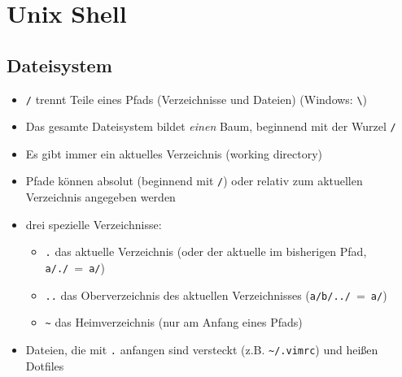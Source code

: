 \documentclass{article}
\begin{document}
  \section{Unix Shell}
    \subsection{Dateisystem}
      \begin{itemize}
        \item \texttt{/} trennt Teile eines Pfads (Verzeichnisse und Dateien) (Windows: \texttt{\textbackslash})
        \item Das gesamte Dateisystem bildet \emph{einen} Baum, beginnend mit der Wurzel \texttt{/}
        \item Es gibt immer ein aktuelles Verzeichnis (working directory)
        \item Pfade können absolut (beginnend mit \texttt{/}) oder relativ zum aktuellen Verzeichnis angegeben werden
        \item drei spezielle Verzeichnisse:
          \begin{itemize}
            \item \texttt{.} das aktuelle Verzeichnis (oder der aktuelle im bisherigen Pfad, \texttt{a/./}~=~\texttt{a/})
            \item \texttt{..} das Oberverzeichnis des aktuellen Verzeichnisses (\texttt{a/b/../}~=~\texttt{a/})
            \item \texttt{\textasciitilde} das Heimverzeichnis (nur am Anfang eines Pfads)
          \end{itemize}
        \item Dateien, die mit \texttt{.} anfangen sind versteckt (z.B. \texttt{\textasciitilde/.vimrc}) und heißen Dotfiles
      \end{itemize}
\end{document}
